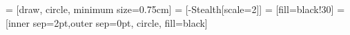 \usepackage[utf8]{inputenc}
\usepackage[T1]{fontenc}
\usepackage{tikz}

\usetikzlibrary{arrows.meta}
\usetikzlibrary{shapes.multipart}
\usetikzlibrary{patterns}


 = [draw, circle, minimum size=0.75cm]
 = [-{Stealth[scale=2]}]
 = [fill=black!30]
 = [inner sep=2pt,outer sep=0pt, circle, fill=black]

\newcommand{\intset}[1]{[\![{#1}]\!]}

\newcommand{\pair}[2]{\langle{#1},{#2}\rangle}